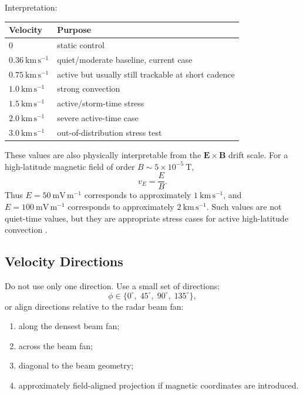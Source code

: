 \documentclass[11pt]{article}
\newcommand{\kmps}{\mathrm{km\,s^{-1}}}
\begin{document}
Interpretation:
\begin{center}
\begin{tabular}{ll}
\toprule
Velocity & Purpose \\
\midrule
$0$ & static control \\
$0.36~\kmps$ & quiet/moderate baseline, current case \\
$0.75~\kmps$ & active but usually still trackable at short cadence \\
$1.0~\kmps$ & strong convection \\
$1.5~\kmps$ & active/storm-time stress \\
$2.0~\kmps$ & severe active-time case \\
$3.0~\kmps$ & out-of-distribution stress test \\
\bottomrule
\end{tabular}
\end{center}

These values are also physically interpretable from the $\mathbf{E}\times\mathbf{B}$ drift scale.
For a high-latitude magnetic field of order $B\sim 5\times 10^{-5}~\mathrm{T}$,
\begin{equation}
  v_E = \frac{E}{B}.
\end{equation}
Thus $E=50~\mathrm{mV\,m^{-1}}$ corresponds to approximately $1~\kmps$, and
$E=100~\mathrm{mV\,m^{-1}}$ corresponds to approximately $2~\kmps$. Such values are not
quiet-time values, but they are appropriate stress cases for active high-latitude convection
\cite{Kelley2009,Greenwald1995SuperDARN,Chisham2007SuperDARN}.

\subsection{Velocity Directions}

Do not use only one direction. Use a small set of directions:
\begin{equation}
  \phi \in \{0^\circ,\;45^\circ,\;90^\circ,\;135^\circ\},
\end{equation}
or align directions relative to the radar beam fan:
\begin{enumerate}[leftmargin=*]
  \item along the densest beam fan;
  \item across the beam fan;
  \item diagonal to the beam geometry;
  \item approximately field-aligned projection if magnetic coordinates are introduced.
\end{enumerate}
\end{document}
